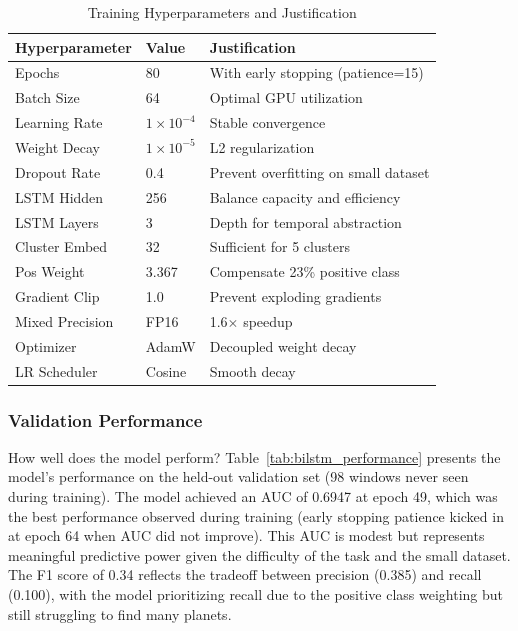 \documentclass[letterpaper]{article} %
\begin{document}
\begin{table}[h]
\centering
\caption{Training Hyperparameters and Justification}
\label{tab:bilstm_hyperparams}
\begin{tabular}{@{}llp{3.5cm}@{}}
\toprule
\textbf{Hyperparameter} & \textbf{Value} & \textbf{Justification} \\
\midrule
Epochs & 80 & With early stopping (patience=15) \\
Batch Size & 64 & Optimal GPU utilization \\
Learning Rate & $1 \times 10^{-4}$ & Stable convergence \\
Weight Decay & $1 \times 10^{-5}$ & L2 regularization \\
Dropout Rate & 0.4 & Prevent overfitting on small dataset \\
LSTM Hidden & 256 & Balance capacity and efficiency \\
LSTM Layers & 3 & Depth for temporal abstraction \\
Cluster Embed & 32 & Sufficient for 5 clusters \\
Pos Weight & 3.367 & Compensate 23\% positive class \\
Gradient Clip & 1.0 & Prevent exploding gradients \\
Mixed Precision & FP16 & 1.6$\times$ speedup \\
Optimizer & AdamW & Decoupled weight decay \\
LR Scheduler & Cosine & Smooth decay \\
\bottomrule
\end{tabular}
\end{table}

\subsubsection{Validation Performance}

How well does the model perform? Table~\ref{tab:bilstm_performance} presents the model's performance on the held-out validation set (98 windows never seen during training). The model achieved an AUC of 0.6947 at epoch 49, which was the best performance observed during training (early stopping patience kicked in at epoch 64 when AUC did not improve). This AUC is modest but represents meaningful predictive power given the difficulty of the task and the small dataset. The F1 score of 0.34 reflects the tradeoff between precision (0.385) and recall (0.100), with the model prioritizing recall due to the positive class weighting but still struggling to find many planets.
\end{document}

